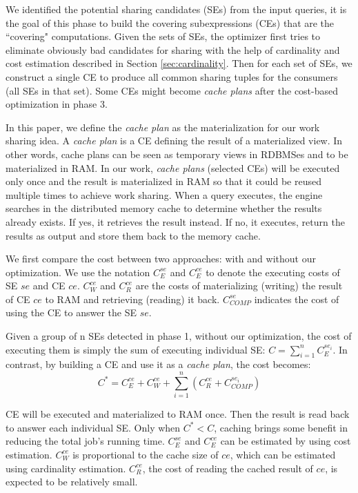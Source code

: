 We identified the potential sharing candidates (SEs) from the input queries, it is the goal of this phase to build the covering subexpressions (CEs) that are the ``covering" computations. Given the sets of SEs, the optimizer first tries to eliminate obviously bad candidates for sharing with the help of cardinality and cost estimation described in Section \ref{sec:cardinality}. Then for each set of SEs, we construct a single CE to produce all common sharing tuples for the consumers (all SEs in that set). Some CEs might become \emph{cache plans} after the cost-based optimization in phase 3. 

In this paper, we define the \emph{cache plan} as the materialization for our work sharing idea. A \emph{cache plan} is a CE defining the result of a materialized view. In other words, cache plans can be seen as temporary views in RDBMSes and to be materialized in RAM. In our work, \emph{cache plans} (selected CEs) will be executed only once and the result is materialized in RAM so that it could be reused multiple times to achieve work sharing. When a query executes, the engine searches in the distributed memory cache to determine whether the results already exists. If yes, it retrieves the result instead. If no, it executes, return the results as output and store them back to the memory cache.

We first compare the cost between two approaches: with and without our optimization. We use the notation $C_{E}^{se}$ and $C_{E}^{ce}$ to denote the executing costs of SE $se$ and CE $ce$. $C_{W}^{ce}$ and $C_{R}^{ce}$ are the costs of materializing (writing) the result of CE $ce$ to RAM and retrieving (reading) it back. $C_{COMP}^{se}$ indicates the cost of using the CE to answer the SE $se$.

Given a group of n SEs detected in phase 1, without our optimization, the cost of executing them is simply the sum of executing individual SE: $C = \sum _{i=1}^{n}C_{E}^{se_i}$. In contrast, by building a CE and use it as a \emph{cache plan}, the cost becomes: 
\[C^* = C_{E}^{ce} + C_{W}^{ce} + \sum _{i=1}^{n}(C_{R}^{ce} + C_{COMP}^{se_i})\]

CE will be executed and materialized to RAM once. Then the result is read back to answer each individual SE. Only when $C^* < C$, caching brings some benefit in reducing the total job's running time. $C_{E}^{se}$ and $C_{E}^{ce}$ can be estimated by using cost estimation. $C_{W}^{ce}$ is proportional to the cache size of $ce$, which can be estimated using cardinality estimation. $C_{R}^{ce}$, the cost of reading the cached result of $ce$, is expected to be relatively small.

